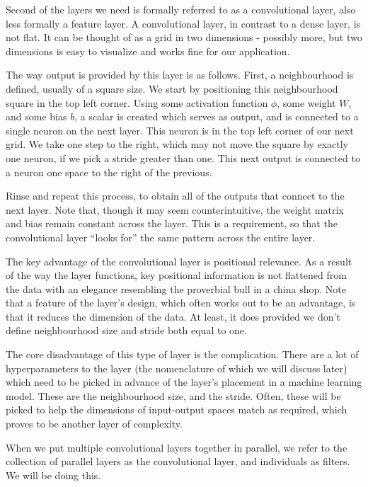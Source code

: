 \documentclass{article}
\begin{document}
Second of the layers we need is formally referred to as a convolutional layer, also less formally a feature layer. A convolutional layer, in contrast to a dense layer, is not flat. It can be thought of as a grid in two dimensions - possibly more, but two dimensions is easy to visualize and works fine for our application.

The way output is provided by this layer is as follows. First, a neighbourhood is defined, usually of a square size. We start by positioning this neighbourhood square in the top left corner. Using some activation function $\phi$, some weight $W$, and some bias $b$, a scalar is created which serves as output, and is connected to a single neuron on the next layer. This neuron is in the top left corner of our next grid. We take one step to the right, which may not move the square by exactly one neuron, if we pick a stride greater than one. This next output is connected to a neuron one space to the right of the previous.

Rinse and repeat this process, to obtain all of the outputs that connect to the next layer. Note that, though it may seem counterintuitive, the weight matrix and bias remain constant across the layer. This is a requirement, so that the convolutional layer “looks for” the same pattern across the entire layer.

The key advantage of the convolutional layer is positional relevance. As a result of the way the layer functions, key positional information is not flattened from the data with an elegance resembling the proverbial bull in a china shop. Note that a feature of the layer’s design, which often works out to be an advantage, is that it reduces the dimension of the data. At least, it does provided we don’t define neighbourhood size and stride both equal to one.

The core disadvantage of this type of layer is the complication. There are a lot of hyperparameters to the layer (the nomenclature of which we will discuss later) which need to be picked in advance of the layer’s placement in a machine learning model. These are the neighbourhood size, and the stride. Often, these will be picked to help the dimensions of input-output spaces match as required, which proves to be another layer of complexity.

When we put multiple convolutional layers together in parallel, we refer to the collection of parallel layers as the convolutional layer, and individuals as filters. We will be doing this.\\\\
\end{document}
